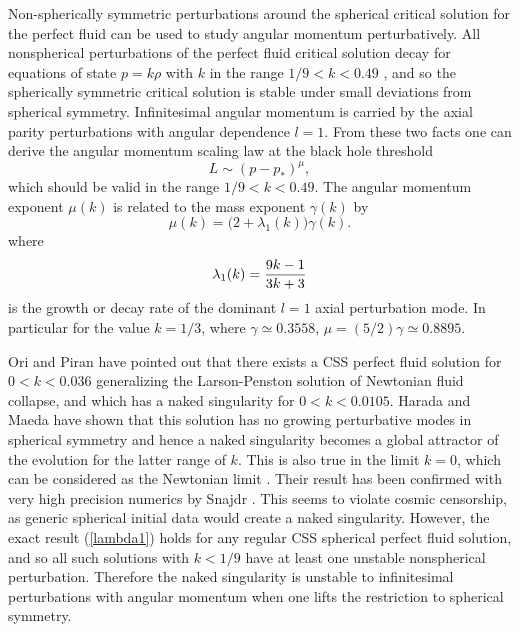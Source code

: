 \documentclass{article}
\begin{document}
Non-spherically symmetric perturbations around the spherical critical
solution for the perfect fluid can be used to study angular momentum
perturbatively. All nonspherical perturbations of the perfect fluid
critical solution decay for equations of state $p=k\rho$ with $k$ in
the range $1/9<k<0.49$ \cite{Gundlach_nonspherical}, and so the
spherically symmetric critical solution is stable under small
deviations from spherical symmetry. Infinitesimal angular momentum is
carried by the axial parity perturbations with angular dependence
$l=1$. From these two facts one can derive the angular momentum
scaling law at the black hole threshold
\cite{Gundlach_angmom,Gundlach_critfluid2}
\begin{equation}
\label{CSS_L}
L \sim (p-p_*)^\mu,
\end{equation}
which should be valid in the range $1/9<k<0.49$. The angular momentum
exponent $\mu(k)$ is related to the mass exponent $\gamma(k)$ by
\begin{equation}
\label{muofk}
\mu(k) = \Big(2+\lambda_1(k)\Big)\gamma(k) .
\end{equation}
where 
\begin{equation}
\label{lambda1}
\lambda_1(k)={9k-1\over 3k+3}
\end{equation}
is the growth or decay rate of the dominant $l=1$ axial
perturbation mode. In particular for the value $k=1/3$, where
$\gamma\simeq 0.3558$, $\mu=(5/2)\gamma\simeq 0.8895$. 

Ori and Piran \cite{OriPiran2} have pointed out that there exists a
CSS perfect fluid solution for $0<k<0.036$ generalizing the
Larson-Penston solution of Newtonian fluid collapse, and which
has a naked singularity for $0<k<0.0105$. Harada and Maeda
\cite{Harada,HaradaMaeda} have shown that this solution has no growing
perturbative modes in spherical symmetry and hence a naked singularity
becomes a global attractor of the evolution for the latter range of
$k$. This is also true in the limit $k=0$, which can be considered as
the Newtonian limit \cite{HaradaMaeda2, HaradaMaeda3}. 
Their result has been confirmed with very high precision
numerics by Snajdr \cite{Snajdr}.
This seems to violate cosmic censorship, as generic spherical initial
data would create a naked singularity. However, the exact result
(\ref{lambda1}) holds for any regular CSS spherical perfect fluid
solution, and so all such 
solutions with $k<1/9$ have at least one unstable nonspherical
perturbation. Therefore the naked singularity is unstable
to infinitesimal perturbations with angular momentum when one lifts the
restriction to spherical symmetry.
\end{document}
